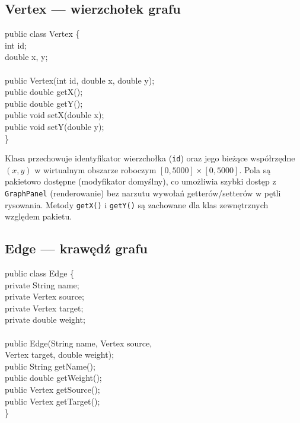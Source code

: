 \documentclass[a4paper, 11pt]{article}
\begin{document}
\subsection{Vertex --- wierzchołek grafu}

\begin{filebox}
public class Vertex \{\\
\quad int id;\\
\quad double x, y;\\
\\
\quad public Vertex(int id, double x, double y);\\
\quad public double getX();\\
\quad public double getY();\\
\quad public void setX(double x);\\
\quad public void setY(double y);\\
\}
\end{filebox}

Klasa przechowuje identyfikator wierzchołka (\texttt{id}) oraz jego
bieżące współrzędne $(x, y)$ w wirtualnym obszarze roboczym
$[0, 5000] \times [0, 5000]$. Pola są pakietowo dostępne (modyfikator
domyślny), co umożliwia szybki dostęp z \texttt{GraphPanel} (renderowanie)
bez narzutu wywołań getterów/setterów w pętli rysowania. Metody
\texttt{getX()} i \texttt{getY()} są zachowane dla klas zewnętrznych
względem pakietu.

\subsection{Edge --- krawędź grafu}

\begin{filebox}
public class Edge \{\\
\quad private String name;\\
\quad private Vertex source;\\
\quad private Vertex target;\\
\quad private double weight;\\
\\
\quad public Edge(String name, Vertex source,\\
\quad \qquad\qquad\; Vertex target, double weight);\\
\quad public String getName();\\
\quad public double getWeight();\\
\quad public Vertex getSource();\\
\quad public Vertex getTarget();\\
\}
\end{filebox}
\end{document}
